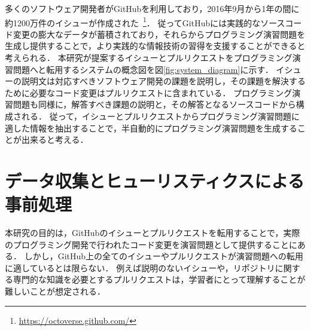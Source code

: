 多くのソフトウェア開発者がGitHubを利用しており，2016年9月から1年の間に約1200万件のイシューが作成された~\footnote{\url{https://octoverse.github.com/}}．
従ってGitHubには実践的なソースコード変更の膨大なデータが蓄積されており，それらからプログラミング演習問題を生成し提供することで，より実践的な情報技術の習得を支援することができると考えられる．
本研究が提案するイシューとプルリクエストをプログラミング演習問題へと転用するシステムの概念図を図\ref{fig:system_diagram}に示す．
イシューの説明文は対応すべきソフトウェア開発の課題を説明し，その課題を解決するために必要なコード変更はプルリクエストに含まれている．
プログラミング演習問題も同様に，解答すべき課題の説明と，その解答となるソースコードから構成される．
従って，イシューとプルリクエストからプログラミング演習問題に適した情報を抽出することで，半自動的にプログラミング演習問題を生成することが出来ると考える．


\section{データ収集とヒューリスティクスによる事前処理}

本研究の目的は，GitHubのイシューとプルリクエストを転用することで，実際のプログラミング開発で行われたコード変更を演習問題として提供することにある．
しかし，GitHub上の全てのイシューやプルリクエストが演習問題への転用に適しているとは限らない．
例えば説明のないイシューや，リポジトリに関する専門的な知識を必要とするプルリクエストは，学習者にとって理解することが難しいことが想定される．

